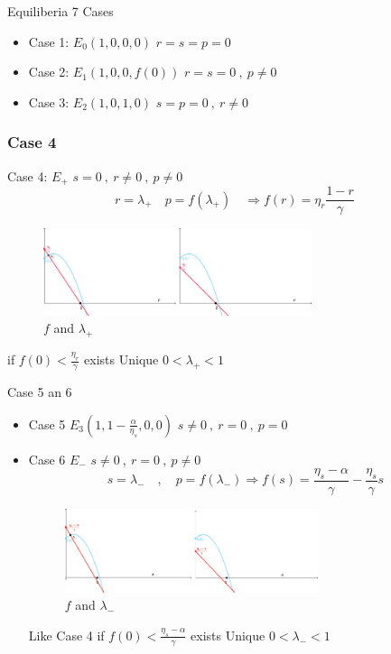 \documentclass{beamer}
\begin{document}
\begin{frame}{Equiliberia}
  7 Cases 
\begin{itemize}
  \item Case 1: \(E_0 (1,0,0,0) \)   \(r = s = p = 0\)
  \item Case 2: \(E_1 (1,0,0,f(0)) \)   \( r = s = 0 \ , \ p \neq 0 \)
  \item Case 3: \(E_2 (1,0,1,0) \)   \( s = p = 0 \ , \ r \neq 0 \)
\end{itemize}
\end{frame}

\begin{frame}[shrink= 10]
  \frametitle{Case 4}
  Case 4: \(E_+ \)  \( s = 0 \ , \ r \neq 0 \ , \ p \neq 0 \) 
  \[ r = \lambda_+ \quad p = f(\lambda_+) \quad \Rightarrow f(r) = \eta_r \frac{1 - r}{\gamma} \]
  \vspace{-10mm}    
  \begin{figure}
      \includegraphics[width=0.7\textwidth]{1-s2.0-S1007570424005975-gr3.jpg}
      \caption{\(f\) and \(\lambda_+\) \cite{MOSTEFAOUI2025108412}}
  \end{figure}
  \vspace{-5mm}
  if \( f(0)  < \frac{\eta_r}{\gamma} \) exists Unique \( 0 < \lambda_+ < 1 \)  
\end{frame}

\begin{frame}[shrink= 20]{Case 5 an 6 }
  \begin{itemize}
    \item Case 5 \(E_3(1,1-\frac{\alpha}{\eta_s},0,0)\)
   \(s \neq 0 \ , \ r = 0 \ , \ p = 0 \) 
    \item Case 6 \( E_- \) 
    \(s \neq 0 \ , \ r = 0 \ , \ p \neq 0 \) 
    \[ s = \lambda_- \quad , \quad p = f(\lambda_-) \Rightarrow f(s) = \frac{\eta_s- \alpha}{\gamma} - \frac{\eta_s}{\gamma}s\]
    
     \begin{figure}
    	\includegraphics[width=0.7\textwidth]{1-s2.0-S1007570424005975-gr4.jpg}
    	\caption{\(f\) and \(\lambda_-\) \cite{MOSTEFAOUI2025108412}}
    \end{figure}
    
    Like Case 4 if \( f(0) < \frac{\eta_s- \alpha}{\gamma} \) exists Unique \( 0  < \lambda_- < 1 \) 
  \end{itemize}

\end{frame}
\end{document}

